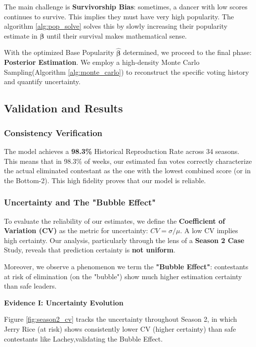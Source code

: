 The main challenge is \textbf{Survivorship Bias}: sometimes, a dancer with low scores continues to survive. This implies they must have very high popularity. The algorithm \ref{alg:pop_solve} solves this by slowly increasing their popularity estimate in $\boldsymbol{\beta}$ until their survival makes mathematical sense.

With the optimized Base Popularity $\hat{\boldsymbol{\beta}}$ determined,
we proceed to the final phase: \textbf{Posterior Estimation}.
We employ a high-density Monte Carlo Sampling(Algorithm \ref{alg:monte_carlo})
to reconstruct the specific voting history and quantify uncertainty.


\subsection{Validation and Results}

\subsubsection{Consistency Verification}
The model achieves a \textbf{98.3\%} Historical Reproduction Rate across 34 seasons.
This means that in 98.3\% of weeks, our estimated fan votes correctly
characterize the actual eliminated contestant as the one with
the lowest combined score (or in the Bottom-2).
This high fidelity proves that our model is reliable.

\subsubsection{Uncertainty and The "Bubble Effect"}

To evaluate the reliability of our estimates,
we define the \textbf{Coefficient of Variation (CV)} as the metric for uncertainty: $CV = \sigma / \mu$.
A low CV implies high certainty. Our analysis,
particularly through the lens of a \textbf{Season 2 Case} Study,
reveals that prediction certainty is \textbf{not uniform}.

Moreover, we observe a phenomenon we term the \textbf{"Bubble Effect"}:
contestants at risk of elimination (on the "bubble")
show much higher estimation certainty than safe leaders.

\textbf{Evidence I: Uncertainty Evolution}

Figure \ref{fig:season2_cv} tracks the uncertainty throughout Season 2, in which Jerry Rice (at risk) shows consistently lower CV (higher certainty) than safe contestants like Lachey,validating the Bubble Effect. 

